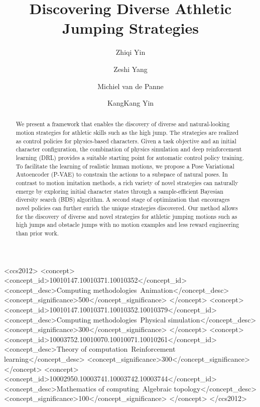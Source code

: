 \documentclass[acmtog]{acmart}
\begin{document}
\title{Discovering Diverse Athletic Jumping Strategies}

\author{Zhiqi Yin}
\author{Zeshi Yang}
\author{Michiel van de Panne}
\author{KangKang Yin}


\newcommand*{\clip}{\mathop{\mathrm{Clip}}\nolimits}
\newcommand*{\diag}{\mathop{\mathrm{diag}}\nolimits}



\begin{abstract}
We present a framework that enables the discovery of diverse and natural-looking motion strategies for athletic skills such as the high jump. The strategies are realized as control policies for physics-based characters. Given a task objective and an initial character configuration, the combination of physics simulation and deep reinforcement learning (DRL) provides a suitable starting point for automatic control policy training. To facilitate the learning of realistic human motions, we propose a Pose Variational Autoencoder (P-VAE) to constrain the actions to a subspace of natural poses. In contrast to motion imitation methods, a rich variety of novel strategies can naturally emerge by exploring initial character states through a sample-efficient Bayesian diversity search (BDS) algorithm. A second stage of optimization that encourages novel policies can further enrich the unique strategies discovered. Our method allows for the discovery of diverse and novel strategies for athletic jumping motions such as high jumps and obstacle jumps with no motion examples and less reward engineering than prior work.
\end{abstract}

%
%
\begin{CCSXML}
<ccs2012>
<concept>
<concept_id>10010147.10010371.10010352</concept_id>
<concept_desc>Computing methodologies~Animation</concept_desc>
<concept_significance>500</concept_significance>
</concept>
<concept>
<concept_id>10010147.10010371.10010352.10010379</concept_id>
<concept_desc>Computing methodologies~Physical simulation</concept_desc>
<concept_significance>300</concept_significance>
</concept>
<concept>
<concept_id>10003752.10010070.10010071.10010261</concept_id>
<concept_desc>Theory of computation~Reinforcement learning</concept_desc>
<concept_significance>300</concept_significance>
</concept>
<concept>
<concept_id>10002950.10003741.10003742.10003744</concept_id>
<concept_desc>Mathematics of computing~Algebraic topology</concept_desc>
<concept_significance>100</concept_significance>
</concept>
</ccs2012>
\end{CCSXML}
\end{document}
